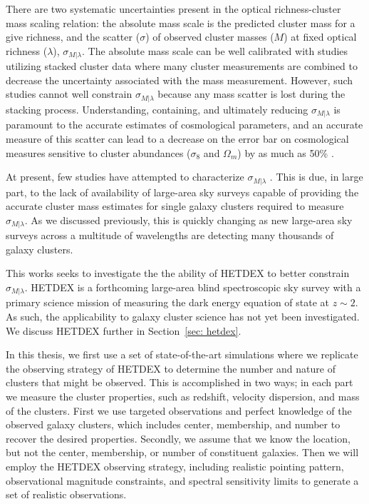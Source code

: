 There are two systematic uncertainties present in the optical richness-cluster mass scaling relation: the absolute mass scale is the predicted cluster mass for a give richness, and the scatter ($\sigma$) of observed cluster masses ($M$) at fixed optical richness ($\lambda$), $\sigma_{M|\lambda}$. The absolute mass scale can be well calibrated with studies utilizing stacked cluster data  where many cluster measurements are combined to decrease the uncertainty associated with the mass measurement. However, such studies cannot well constrain $\sigma_{M|\lambda}$ because any mass scatter is lost during the stacking process. Understanding, containing, and ultimately reducing $\sigma_{M|\lambda}$ is paramount to the accurate estimates of cosmological parameters, and an accurate measure of this scatter can lead to a decrease on the error bar on cosmological measures sensitive to cluster abundances ($\sigma_8$ and $\Omega_m$) by as much as 50\% \citep{Rozo2010}.

At present, few studies have attempted to characterize $\sigma_{M|\lambda}$ \citep{Rozo2014,Rozo2015, Saro2015, Rykoff2016}. This is due, in large part, to the lack of availability of large-area sky surveys capable of providing the accurate cluster mass estimates for single galaxy clusters required to measure $\sigma_{M|\lambda}$. As we discussed previously, this is quickly changing as new large-area sky surveys across a multitude of wavelengths are detecting many thousands of galaxy clusters. 

This works seeks to investigate the the ability of HETDEX to better constrain $\sigma_{M|\lambda}$. HETDEX is a forthcoming large-area blind spectroscopic sky survey with a primary science mission of measuring the dark energy equation of state at $z\sim2$. As such, the applicability to galaxy cluster science has not yet been investigated. We discuss HETDEX further in Section~\ref{sec: hetdex}.

In this thesis, we first use a set of state-of-the-art simulations where we replicate the observing strategy of HETDEX to determine the number and nature of clusters that might be observed. This is accomplished in two ways; in each part we measure the cluster properties, such as redshift, velocity dispersion, and mass of the clusters. First we use targeted observations and perfect knowledge of the observed galaxy clusters, which includes center, membership, and number to recover the desired properties. Secondly, we assume that we know the location, but not the center, membership, or number of constituent galaxies. Then we will employ the HETDEX observing strategy, including realistic pointing pattern, observational magnitude constraints, and spectral sensitivity limits to generate a set of realistic observations.

